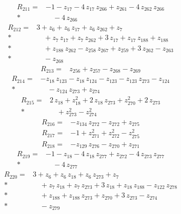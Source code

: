 \documentclass[10pt]{article}
\begin{document}
\begin{align*}
R_{211}={}& - 1 - z_{17} - 4\,z_{17}\,z_{266} + z_{261} - 4\,z_{262}\,z_{266} \\*
&\quad - 4\,z_{266}
\end{align*}
\begin{align*}
R_{212}={}& 3 + z_{6} + z_{6}\,z_{17} + z_{6}\,z_{262} + z_{7} \\*
&\quad + z_{7}\,z_{17} + z_{7}\,z_{262} + 3\,z_{17} + z_{17}\,z_{188} + z_{188} \\*
&\quad + z_{188}\,z_{262} - z_{258}\,z_{267} + z_{259} + 3\,z_{262} - z_{263} \\*
&\quad - z_{268}
\end{align*}
\begin{align*}
R_{213}={}& z_{256} + z_{257} - z_{268} - z_{269}
\end{align*}
\begin{align*}
R_{214}={}& - z_{18}\,z_{123} - z_{18}\,z_{124} - z_{123} - z_{123}\,z_{273} - z_{124} \\*
&\quad - z_{124}\,z_{273} + z_{274}
\end{align*}
\begin{align*}
R_{215}={}& 2\,z_{18} + z_{18}^{2} + 2\,z_{18}\,z_{273} + z_{270}^{2} + 2\,z_{273} \\*
&\quad + z_{273}^{2} - z_{274}^{2}
\end{align*}
\begin{align*}
R_{216}={}& - z_{134}\,z_{272} - z_{272} + z_{275}
\end{align*}
\begin{align*}
R_{217}={}& - 1 + z_{271}^{2} + z_{272}^{2} - z_{275}^{2}
\end{align*}
\begin{align*}
R_{218}={}& - z_{129}\,z_{276} - z_{270} + z_{271}
\end{align*}
\begin{align*}
R_{219}={}& - 1 - z_{18} - 4\,z_{18}\,z_{277} + z_{272} - 4\,z_{273}\,z_{277} \\*
&\quad - 4\,z_{277}
\end{align*}
\begin{align*}
R_{220}={}& 3 + z_{6} + z_{6}\,z_{18} + z_{6}\,z_{273} + z_{7} \\*
&\quad + z_{7}\,z_{18} + z_{7}\,z_{273} + 3\,z_{18} + z_{18}\,z_{188} - z_{122}\,z_{278} \\*
&\quad + z_{188} + z_{188}\,z_{273} + z_{270} + 3\,z_{273} - z_{274} \\*
&\quad - z_{279}
\end{align*}
\end{document}
